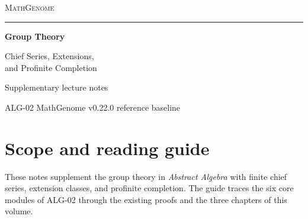 \documentclass[11pt,oneside,openany]{book}
\theoremstyle{definition}
\theoremstyle{remark}
\begin{document}
\frontmatter
\hypersetup{pageanchor=false}
\begin{titlepage}
  \thispagestyle{empty}
  \begin{flushleft}
    \vspace*{0.65in}
    {\large\scshape\color{deepgreen}MathGenome\par}
    \vspace{0.32in}
    {\color{rulegreen}\rule{0.94\textwidth}{0.65pt}\par}
    \vspace{0.45in}
    {\color{ink}\fontsize{34}{39}\selectfont\bfseries
       Group Theory\par}
    \vspace{0.30in}
    {\color{deepgreen}\Large
       Chief Series, Extensions,\\[3pt] and Profinite Completion\par}
    \vfill
    {\large Supplementary lecture notes\par}
    \vspace{0.12in}
    {\normalsize ALG-02 \enspace\textperiodcentered\enspace MathGenome v0.22.0 reference baseline\par}
    \vspace*{0.48in}
  \end{flushleft}
\end{titlepage}
\hypersetup{pageanchor=true}
{\small\tableofcontents}
\chapter*{Scope and reading guide}

These notes supplement the group theory in \emph{Abstract Algebra}
with finite chief series, extension classes, and profinite completion.
The guide traces the six core modules of ALG-02 through the existing
proofs and the three chapters of this volume.

{\setlength{\fboxsep}{0.8em}\setlength{\fboxrule}{0.35pt}%
\noindent{}\par}
\end{document}
